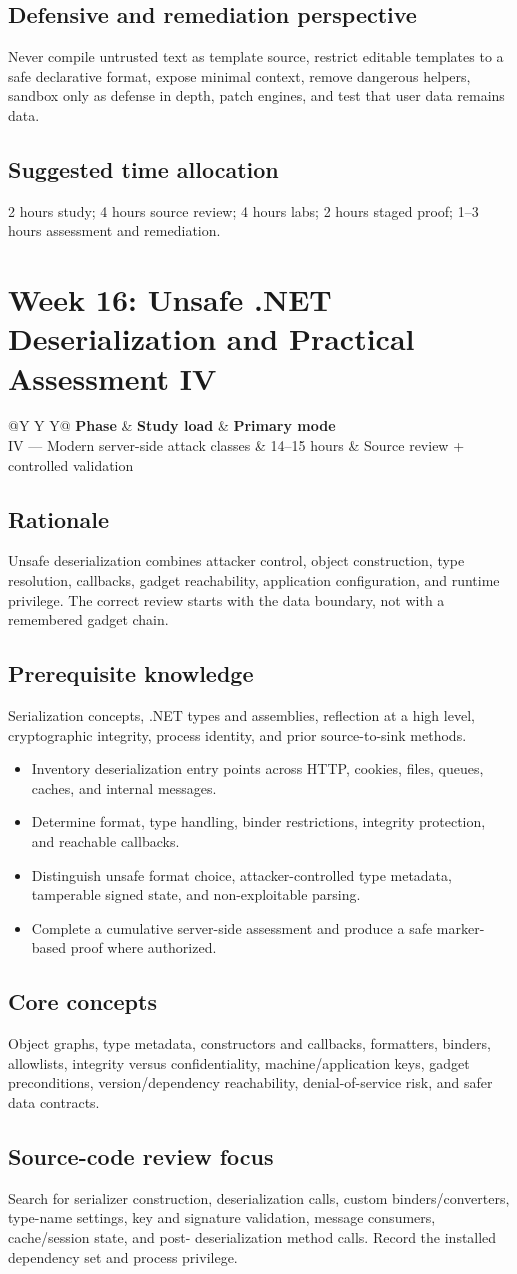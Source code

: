 \documentclass[11pt]{article}
\makeatletter
\newcommand{\weekheader}[4]{%
  \clearpage
  \section{Week #1: #2}
  \begin{tcolorbox}[colback=Navy,colframe=Navy,coltext=white]
    \begin{tabularx}{\linewidth}{@{}Y Y Y@{}}
      \textbf{Phase} & \textbf{Study load} & \textbf{Primary mode}\\
      #3 & #4 hours & Source review + controlled validation
    \end{tabularx}
  \end{tcolorbox}
}
\newcommand{\weekfield}[2]{%
  \Needspace{5\baselineskip}
  \subsection*{#1}
  #2
}
\makeatother
\begin{document}
\weekfield{Defensive and remediation perspective}{Never compile untrusted text as
template source, restrict editable templates to a safe declarative format, expose
minimal context, remove dangerous helpers, sandbox only as defense in depth,
patch engines, and test that user data remains data.}

\weekfield{Suggested time allocation}{2 hours study; 4 hours source review; 4
hours labs; 2 hours staged proof; 1--3 hours assessment and remediation.}

\weekheader{16}{Unsafe .NET Deserialization and Practical Assessment IV}{IV --- Modern server-side attack classes}{14--15}

\weekfield{Rationale}{Unsafe deserialization combines attacker control, object
construction, type resolution, callbacks, gadget reachability, application
configuration, and runtime privilege. The correct review starts with the data
boundary, not with a remembered gadget chain.}

\weekfield{Prerequisite knowledge}{Serialization concepts, .NET types and
assemblies, reflection at a high level, cryptographic integrity, process identity,
and prior source-to-sink methods.}

\begin{objectivebox}
\begin{itemize}
  \item Inventory deserialization entry points across HTTP, cookies, files, queues, caches, and internal messages.
  \item Determine format, type handling, binder restrictions, integrity protection, and reachable callbacks.
  \item Distinguish unsafe format choice, attacker-controlled type metadata, tamperable signed state, and non-exploitable parsing.
  \item Complete a cumulative server-side assessment and produce a safe marker-based proof where authorized.
\end{itemize}
\end{objectivebox}

\weekfield{Core concepts}{Object graphs, type metadata, constructors and
callbacks, formatters, binders, allowlists, integrity versus confidentiality,
machine/application keys, gadget preconditions, version/dependency reachability,
denial-of-service risk, and safer data contracts.}

\weekfield{Source-code review focus}{Search for serializer construction,
deserialization calls, custom binders/converters, type-name settings, key and
signature validation, message consumers, cache/session state, and post-
deserialization method calls. Record the installed dependency set and process
privilege.}
\end{document}
